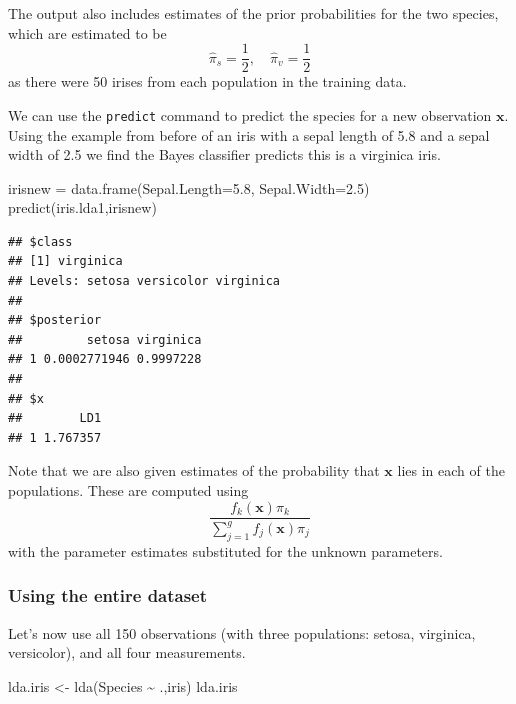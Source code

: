 \documentclass[
]{book}
\newenvironment{Shaded}{\begin{snugshade}}{\end{snugshade}}
\newcommand{\AttributeTok}[1]{\textcolor[rgb]{0.77,0.63,0.00}{#1}}
\newcommand{\FloatTok}[1]{\textcolor[rgb]{0.00,0.00,0.81}{#1}}
\newcommand{\FunctionTok}[1]{\textcolor[rgb]{0.00,0.00,0.00}{#1}}
\newcommand{\NormalTok}[1]{#1}
\newcommand{\OtherTok}[1]{\textcolor[rgb]{0.56,0.35,0.01}{#1}}
\newcommand{\SpecialCharTok}[1]{\textcolor[rgb]{0.00,0.00,0.00}{#1}}
\theoremstyle{definition}
\theoremstyle{definition}
\theoremstyle{definition}
\theoremstyle{definition}
\theoremstyle{remark}
\begin{document}
The output also includes estimates of the prior probabilities for the two species, which are estimated to be
\[\hat{\pi}_s = \frac{1}{2}, \quad \hat{\pi}_v = \frac{1}{2}\]
as there were 50 irises from each population in the training data.

We can use the \texttt{predict} command to predict the species for a new observation \(\mathbf x\). Using the example from before of an iris with a sepal length of 5.8 and a sepal width of 2.5 we find the Bayes classifier predicts this is a virginica iris.

\begin{Shaded}
\begin{Highlighting}[]
\NormalTok{irisnew }\OtherTok{=} \FunctionTok{data.frame}\NormalTok{(}\AttributeTok{Sepal.Length=}\FloatTok{5.8}\NormalTok{, }\AttributeTok{Sepal.Width=}\FloatTok{2.5}\NormalTok{)}
\FunctionTok{predict}\NormalTok{(iris.lda1,irisnew)}
\end{Highlighting}
\end{Shaded}

\begin{verbatim}
## $class
## [1] virginica
## Levels: setosa versicolor virginica
## 
## $posterior
##         setosa virginica
## 1 0.0002771946 0.9997228
## 
## $x
##        LD1
## 1 1.767357
\end{verbatim}

Note that we are also given estimates of the probability that \(\mathbf x\) lies in each of the populations. These are computed using
\[\frac{f_k(\mathbf x)\pi_k}{\sum_{j=1}^g f_j(\mathbf x)\pi_j}\]
with the parameter estimates substituted for the unknown parameters.

\hypertarget{using-the-entire-dataset}{%
\subsubsection*{Using the entire dataset}\label{using-the-entire-dataset}}

Let's now use all 150 observations (with three populations: setosa, virginica, versicolor), and all four measurements.

\begin{Shaded}
\begin{Highlighting}[]
\NormalTok{lda.iris }\OtherTok{\textless{}{-}} \FunctionTok{lda}\NormalTok{(Species }\SpecialCharTok{\textasciitilde{}}\NormalTok{ .,iris)}
\NormalTok{lda.iris }
\end{Highlighting}
\end{Shaded}
\end{document}
